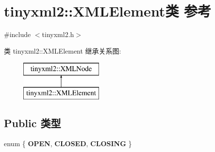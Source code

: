 \hypertarget{classtinyxml2_1_1_x_m_l_element}{}\section{tinyxml2\+:\+:X\+M\+L\+Element类 参考}
\label{classtinyxml2_1_1_x_m_l_element}


{\ttfamily \#include $<$tinyxml2.\+h$>$}

类 tinyxml2\+:\+:X\+M\+L\+Element 继承关系图\+:\begin{figure}[H]
\begin{center}
\leavevmode
\includegraphics[height=2.000000cm]{classtinyxml2_1_1_x_m_l_element}
\end{center}
\end{figure}
\subsection*{Public 类型}
\begin{DoxyCompactItemize}
\item 
\mbox{\label{classtinyxml2_1_1_x_m_l_element_ab08c76ac6290eed6e79f7d578734be16}} 
enum \{ {\bfseries O\+P\+EN}, 
{\bfseries C\+L\+O\+S\+ED}, 
{\bfseries C\+L\+O\+S\+I\+NG}
 \}
\end{DoxyCompactItemize}
